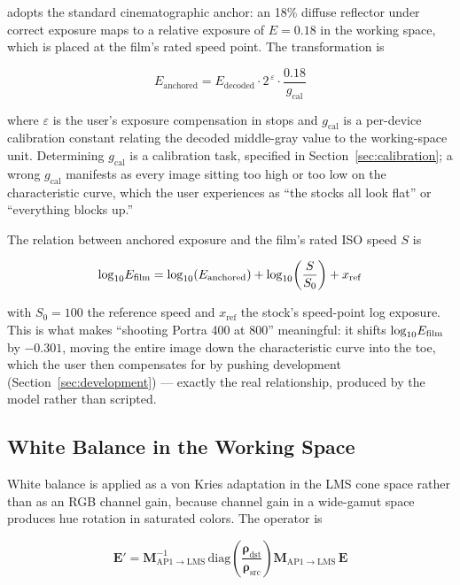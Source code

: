 \EM{} adopts the standard cinematographic anchor: an 18\% diffuse reflector
under correct exposure maps to a relative exposure of $E = 0.18$ in the working
space, which is placed at the film's rated speed point. The transformation is

\begin{equation}
E_{\mathrm{anchored}} = E_{\mathrm{decoded}} \cdot 2^{\,\varepsilon} \cdot
\frac{0.18}{g_{\mathrm{cal}}}
\label{eq:anchor}
\end{equation}

where $\varepsilon$ is the user's exposure compensation in stops and
$g_{\mathrm{cal}}$ is a per-device calibration constant relating the decoded
middle-gray value to the working-space unit. Determining $g_{\mathrm{cal}}$ is a
calibration task, specified in Section~\ref{sec:calibration}; a wrong
$g_{\mathrm{cal}}$ manifests as every image sitting too high or too low on the
characteristic curve, which the user experiences as ``the stocks all look
flat'' or ``everything blocks up.''

The relation between anchored exposure and the film's rated ISO speed $S$ is

\begin{equation}
\log_{10}\!E_{\mathrm{film}} = \log_{10}\!\left(E_{\mathrm{anchored}}\right)
+ \log_{10}\!\left(\frac{S}{S_0}\right) + x_{\mathrm{ref}}
\label{eq:isoshift}
\end{equation}

with $S_0 = 100$ the reference speed and $x_{\mathrm{ref}}$ the stock's
speed-point log exposure. This is what makes ``shooting Portra 400 at 800''
meaningful: it shifts $\log_{10}\!E_{\mathrm{film}}$ by $-0.301$, moving the entire
image down the characteristic curve into the toe, which the user then
compensates for by pushing development (Section~\ref{sec:development}) ---
exactly the real relationship, produced by the model rather than scripted.

\subsection{White Balance in the Working Space}

White balance is applied as a von Kries adaptation in the LMS cone space rather
than as an RGB channel gain, because channel gain in a wide-gamut space
produces hue rotation in saturated colors. The operator is

\begin{equation}
\mathbf{E}' = \mathbf{M}_{\mathrm{AP1}\to\mathrm{LMS}}^{-1}\,
\mathrm{diag}\!\left(\frac{\boldsymbol{\rho}_{\mathrm{dst}}}{\boldsymbol{\rho}_{\mathrm{src}}}\right)
\mathbf{M}_{\mathrm{AP1}\to\mathrm{LMS}}\, \mathbf{E}
\label{eq:vonkries}
\end{equation}

